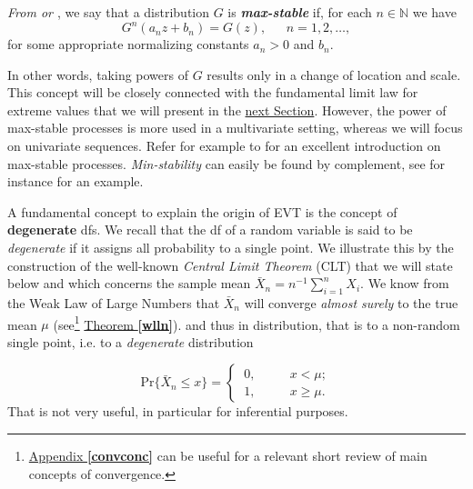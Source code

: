 \begin{definition} \label{maxstab}
	\emph{From \cite{leadbetter_extremes_1983} or \cite{resnick_extreme_1987}}, we say that a distribution $G$ is \emph{\textbf{max-stable}} if, for each $n\in\mathbb{N}$ we have	
	\begin{equation}
	G^n(a_nz+b_n)=G(z), \ \ \ \ \ \ \ n= 1,2,\dots ,
	\end{equation}
	for some appropriate normalizing constants $a_n>0$ and $b_n$.
\end{definition}
In other words, taking powers of $G$ results only in a change of location and scale. This concept will be closely connected with the fundamental limit law for extreme values that we will present in the \hyperref[sec:extrtypethm]{next Section}.
However, the power of max-stable processes is more used in a multivariate setting, whereas we will focus on univariate sequences. Refer for example to \citet{ribatet_spatial_2015} for an excellent introduction on max-stable processes.
\emph{Min-stability} can easily be found by complement, see for instance \citet[pp.23]{ reiss_statistical_2007} for an example.


A fundamental concept to explain the origin of EVT is the concept of \textbf{degenerate} dfs. We recall that the df of a random variable is said to be \emph{degenerate} if it assigns all probability to a single point.
We illustrate this by the construction of the well-known \emph{Central Limit Theorem} (CLT) that we will state below and which concerns the sample mean $\bar{X}_n=n^{-1}\sum_{i=1}^nX_i$. We know from the Weak Law of Large Numbers that  $\bar{X}_n$ will converge \emph{almost surely} to the true mean $\mu$ (see\footnote{\hyperref[convconc]{Appendix \textbf{\ref{convconc}}} can be useful for a relevant short review of main concepts of convergence.} \hyperref[wlln]{Theorem \textbf{\ref{wlln}}}). and thus in distribution, that is to a non-random single point, i.e. to a \emph{degenerate} distribution 

\begin{equation*}
\text{Pr}\big\{\bar{X}_n\leq x\big\}= \begin{cases}
\ 0, \ \ \ \ \ \ \ \ \ \ \ \ x<\mu; \\
\ 1, \ \ \ \  \ \ \ \ \ \ \ \ x\geq \mu. 
\end{cases}
\end{equation*}
That is not very useful, in particular for inferential purposes. 

